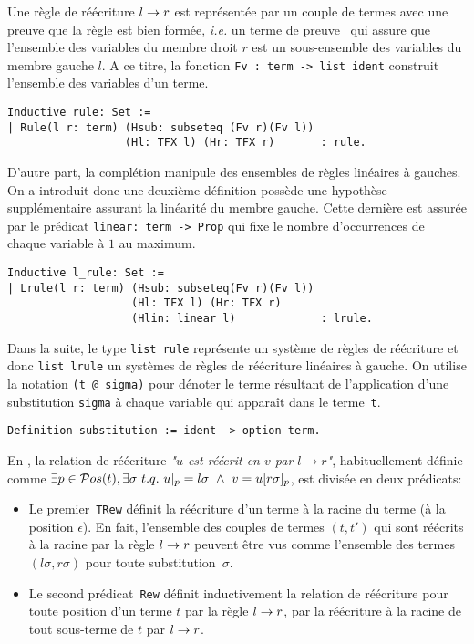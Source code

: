 Une règle de réécriture $l \rightarrow r$ est représentée par un couple de termes avec une preuve
que la règle est bien formée, \textit{i.e.} un terme de preuve \coq\ qui assure que l'ensemble des variables du membre droit $r$
est un sous-ensemble des variables du membre gauche $l$.
A ce titre, la fonction \lstinline!Fv : term -> list ident! construit l'ensemble des variables d'un terme. 
\begin{lstlisting}
Inductive rule: Set :=
| Rule(l r: term) (Hsub: subseteq (Fv r)(Fv l))
                  (Hl: TFX l) (Hr: TFX r)       : rule.
\end{lstlisting}
D'autre part, la complétion manipule des ensembles de règles linéaires à gauches. On a introduit donc une deuxième définition
possède une hypothèse supplémentaire assurant la linéarité du membre gauche. Cette dernière  est assurée par le prédicat
\lstinline!linear: term -> Prop! qui fixe le nombre d'occurrences de chaque variable à $1$ au maximum.
\begin{lstlisting}
Inductive l_rule: Set :=
| Lrule(l r: term) (Hsub: subseteq(Fv r)(Fv l))
                   (Hl: TFX l) (Hr: TFX r)
                   (Hlin: linear l)             : lrule.
\end{lstlisting}

Dans la suite, le type \lstinline!list rule! représente un système de règles de réécriture et donc
\lstinline!list lrule! un systèmes de règles de réécriture linéaires à gauche.
On utilise la notation \lstinline!(t @ sigma)! pour dénoter le terme résultant de 
l'application d'une substitution \lstinline!sigma! à chaque variable qui apparaît dans le terme~\lstinline!t!. 

\begin{lstlisting}
Definition substitution := ident -> option term.
\end{lstlisting}

\noindent
En \coq, la relation de réécriture \emph{"$u$ est réécrit en $v$ par $l
  \rightarrow r$"}, habituellement définie comme $\exists p \in \mathcal{ P}os(t),\exists \sigma \
t.q.\ u|_p = l\sigma \ \land \ v = u [ r\sigma ]_p$, est divisée en deux prédicats:

\begin{itemize}
\item Le premier~\lstinline!TRew! définit la réécriture d'un terme à la racine du terme (à la position $\epsilon$). En
  fait, l'ensemble des couples de termes $(t, t')$ qui sont réécrits à la racine par la règle $l \rightarrow r$
  peuvent être vus comme l'ensemble des termes $(l\sigma, r\sigma)$ pour toute substitution~$\sigma$.

\item 
  Le second prédicat~\lstinline!Rew! définit inductivement la relation de réécriture pour toute position d'un terme $t$
  par la règle $l \rightarrow r$, par la réécriture à la racine de tout sous-terme de $t$ par $l \rightarrow r$.
\end{itemize}


